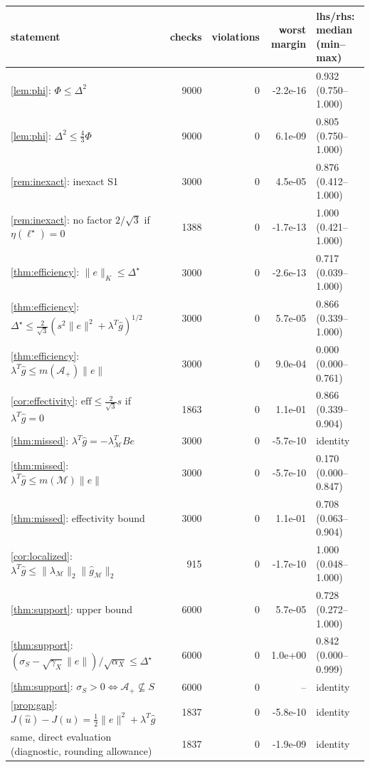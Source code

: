 \begin{tabular}{lrrrl}
\hline
statement & checks & violations & worst margin & lhs/rhs: median (min--max) \\
\hline
\cref{lem:phi}: $\Phi\le\Delta^2$ & 9000 & 0 & -2.2e-16 & 0.932 (0.750--1.000) \\
\cref{lem:phi}: $\Delta^2\le\frac43\Phi$ & 9000 & 0 & 6.1e-09 & 0.805 (0.750--1.000) \\
\cref{rem:inexact}: inexact S1 & 3000 & 0 & 4.5e-05 & 0.876 (0.412--1.000) \\
\cref{rem:inexact}: no factor $2/\sqrt3$ if $\eta(\ell^\star)=0$ & 1388 & 0 & -1.7e-13 & 1.000 (0.421--1.000) \\
\cref{thm:efficiency}: $\|e\|_K\le\Delta^\star$ & 3000 & 0 & -2.6e-13 & 0.717 (0.039--1.000) \\
\cref{thm:efficiency}: $\Delta^\star\le\frac{2}{\sqrt3}(s^2\|e\|^2+\lambda^T\hat g)^{1/2}$ & 3000 & 0 & 5.7e-05 & 0.866 (0.339--1.000) \\
\cref{thm:efficiency}: $\lambda^T\hat g\le m(\mathcal A_+)\|e\|$ & 3000 & 0 & 9.0e-04 & 0.000 (0.000--0.761) \\
\cref{cor:effectivity}: $\mathrm{eff}\le\frac{2}{\sqrt3}s$ if $\lambda^T\hat g=0$ & 1863 & 0 & 1.1e-01 & 0.866 (0.339--0.904) \\
\cref{thm:missed}: $\lambda^T\hat g=-\lambda_{\mathcal M}^TBe$ & 3000 & 0 & -5.7e-10 & identity \\
\cref{thm:missed}: $\lambda^T\hat g\le m(\mathcal M)\|e\|$ & 3000 & 0 & -5.7e-10 & 0.170 (0.000--0.847) \\
\cref{thm:missed}: effectivity bound & 3000 & 0 & 1.1e-01 & 0.708 (0.063--0.904) \\
\cref{cor:localized}: $\lambda^T\hat g\le\|\lambda_{\mathcal M}\|_2\|\hat g_{\mathcal M}\|_2$ & 915 & 0 & -1.7e-10 & 1.000 (0.048--1.000) \\
\cref{thm:support}: upper bound & 6000 & 0 & 5.7e-05 & 0.728 (0.272--1.000) \\
\cref{thm:support}: $(\sigma_S-\sqrt{\gamma_X}\|e\|)/\sqrt{\alpha_X}\le\Delta^\star$ & 6000 & 0 & 1.0e+00 & 0.842 (0.000--0.999) \\
\cref{thm:support}: $\sigma_S>0\iff\mathcal A_+\not\subseteq S$ & 6000 & 0 & -- & identity \\
\cref{prop:gap}: $J(\hat u)-J(u)=\frac12\|e\|^2+\lambda^T\hat g$ & 1837 & 0 & -5.8e-10 & identity \\
same, direct evaluation (diagnostic, rounding allowance) & 1837 & 0 & -1.9e-09 & identity \\

\end{tabular}
